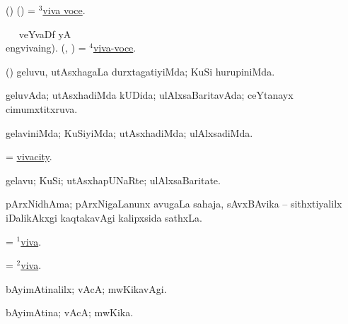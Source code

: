 \bentry 
{} 
\gl{\nA}
\expl{}
\bmng
 (\birx) (\AmA) = \hyperlink{viva voce(3)}{$^3$viva voce}. 
\emng
\eentry

\bentry
{} 
\gl{\sakirx}
\BUkaq\  \ucAcx\ veYvaDf yA  \vakaq\\eng{vivaing}). \bmng
(\birx, \AmA) = \hyperlink{viva-voce(1)}{$^4$viva-voce}. 
\emng
\eentry

\bentry 
{} 
\gl{\kirxvi}
\expl{}
\bmng
 (\saM) geluvu, utAsxhagaLa durxtagatiyiMda; KuSi hurupiniMda. 
\emng
\eentry

\bentry 
{} 
\gl{\gu}
\expl{}
\bmng
 geluvAda; utAsxhadiMda kUDida; ulAlxsaBaritavAda; ceYtanayx cimumxtitxruva. 
\emng
\eentry

\bentry 
{} 
\gl{\kirxvi}
\expl{}
\bmng
 gelaviniMda; KuSiyiMda; utAsxhadiMda; ulAlxsadiMda. 
\emng
\eentry

\bentry
{} 
\gl{\nA}
\expl{}
\bmng
 = \hyperlink{vivacity}{vivacity}. 
\emng
\eentry

\bentry
{} 
\gl{\nA}
\expl{}
\bmng
 gelavu; KuSi; utAsxhapUNaRte; ulAlxsaBaritate. 
\emng
\eentry

\bentry 
{} 
\gl{\nA}
\bmng
 pArxNidhAma; pArxNigaLanunx avugaLa sahaja, sAvxBAvika -- sithxtiyalilx iDalikAkxgi kaqtakavAgi kalipxsida sathxLa. 
\emng
\eentry

\bentry 
{} 
\gl{\BAavayx}
\bmng
 = \hyperlink{viva(1)}{$^1$viva}. 
\emng
\eentry

\bentry
{} 
\gl{\nA}
\expl{}
\bmng
= \hyperlink{viva(2)}{$^2$viva}. 
\emng
\eentry

\bentry
{} 
\gl{\kirxvi}
\expl{}
\bmng
 bAyimAtinalilx; vAcA; mwKikavAgi. 
\emng
\eentry

\bentry
{}  
\gl{\gu}
\expl{}
\bmng
 bAyimAtina; vAcA; mwKika. 
\emng
\eentry


